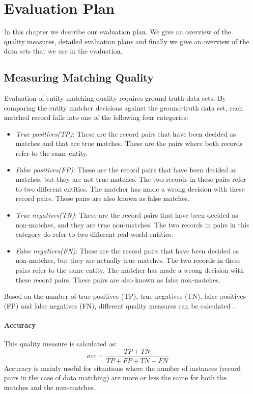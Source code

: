 \chapter{Evaluation Plan}
In this chapter we describe our evaluation plan. We give an overview of the quality measures, detailed evaluation plans and finally we give an overview of the data sets that we use in the evaluation.

\section{Measuring Matching Quality}
Evaluation of entity matching quality requires ground-truth data sets. By comparing the entity matcher decisions against the ground-truth data set, each matched record falls into one of the following four categories\cite{Chri12}:
\begin{itemize}
\item \textit{True positives(TP)}: These are the record pairs that have been decided as matches and that are true matches. These are the pairs where both records refer to the same entity.
\item \textit{False positives(FP)}: These are the record pairs that have been decided as matches, but they are not true matches. The two records in these pairs refer to two different entities. The matcher has made a wrong decision with these record pairs. These pairs are also known as false matches.
\item \textit{True negatives(TN)}: These are the record pairs that have been decided as non-matches, and they are true non-matches. The two records in pairs in this category do refer to two different real-world entities.
\item \textit{False negatives(FN)}: These are the record pairs that have been decided as non-matches, but they are actually true matches. The two records in these pairs refer to the same entity. The matcher has made a wrong decision with these record pairs. These pairs are also known as false non-matches.
\end{itemize}
Based on the number of true positives (TP), true negatives (TN), false positives (FP) and false negatives (FN), different quality measures can be calculated \cite{Chri12}.

\subsubsection{Accuracy}
This quality measure is calculated as:
$$ acc=\frac{TP+TN}{TP+FP+TN+FN}$$
Accuracy is mainly useful for situations where the number of instances (record pairs in the case of data matching) are more or less the same for both the matches and the non-matches. 

